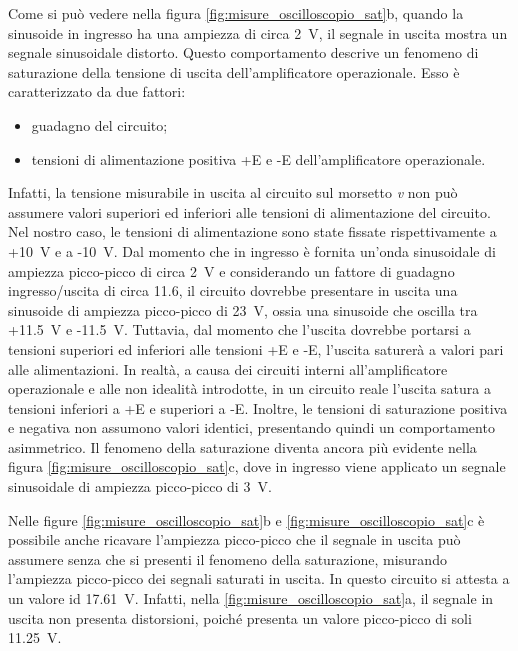\newpage
\noindent
Come si può vedere nella figura \ref{fig:misure_oscilloscopio_sat}b, quando la sinusoide in ingresso ha una ampiezza di circa \SI{2}{\volt}, il segnale in uscita mostra un segnale sinusoidale distorto. Questo comportamento descrive un fenomeno di saturazione della tensione di uscita dell'amplificatore operazionale. Esso è caratterizzato da due fattori:
\begin{itemize}
	\item guadagno del circuito;
	\item tensioni di alimentazione positiva +E e -E dell'amplificatore operazionale.
\end{itemize} 
Infatti, la tensione misurabile in uscita al circuito sul morsetto \textit{v} non può assumere valori superiori ed inferiori alle tensioni di alimentazione del circuito. Nel nostro caso, le tensioni di alimentazione sono state fissate rispettivamente a +\SI{10}{\volt} e a -\SI{10}{\volt}. Dal momento che in ingresso è fornita un'onda sinusoidale di ampiezza picco-picco di circa \SI{2}{\volt} e considerando un fattore di guadagno ingresso/uscita di circa 11.6, il circuito dovrebbe presentare in uscita una sinusoide di ampiezza picco-picco di \SI{23}{\volt}, ossia una sinusoide che oscilla tra +\SI{11.5}{\volt} e -\SI{11.5}{\volt}. Tuttavia, dal momento che l'uscita dovrebbe portarsi a tensioni superiori ed inferiori alle tensioni +E e -E, l'uscita saturerà a valori pari alle alimentazioni. In realtà, a causa dei circuiti interni all'amplificatore operazionale e alle non idealità introdotte, in un circuito reale l'uscita satura a tensioni inferiori a +E e superiori a -E. Inoltre, le tensioni di saturazione positiva e negativa non assumono valori identici, presentando quindi un comportamento asimmetrico. Il fenomeno della saturazione diventa ancora più evidente nella figura \ref{fig:misure_oscilloscopio_sat}c, dove in ingresso viene applicato un segnale sinusoidale di ampiezza picco-picco di \SI{3}{\volt}.

\noindent
Nelle figure \ref{fig:misure_oscilloscopio_sat}b e \ref{fig:misure_oscilloscopio_sat}c  è possibile anche ricavare l'ampiezza picco-picco che il segnale in uscita può assumere senza che si presenti il fenomeno della saturazione, misurando l'ampiezza picco-picco dei segnali saturati in uscita. In questo circuito si attesta a un valore id \SI{17.61}{\volt}. Infatti, nella \ref{fig:misure_oscilloscopio_sat}a, il segnale in uscita non presenta distorsioni, poiché presenta un valore picco-picco di soli \SI{11.25}{\volt}. 

